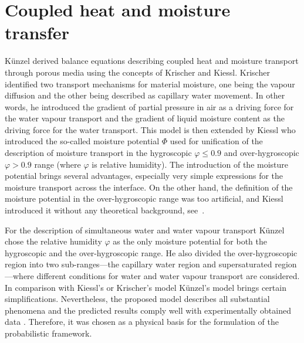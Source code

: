 \documentclass[preprint,12pt]{elsarticle}
\begin{document}
\section{Coupled heat and moisture transfer}
\label{sec:kunzel}
K\"{u}nzel \cite{Kunzel:1995, Kunzel:1997} derived balance equations
describing coupled heat and moisture transport through porous media
using the concepts of Krischer and Kiessl. Krischer
\cite{Krischer:1978} identified two transport mechanisms for material
moisture, one being the vapour diffusion and the other being described
as capillary water movement. In other words, he introduced the
gradient of partial pressure in air as a driving force for the water
vapour transport and the gradient of liquid moisture content as the
driving force for the water transport. This model is then extended by
Kiessl \cite{Kiessl:1983} who introduced the so-called moisture
potential $\Phi$ used for unification of the description of moisture
transport in the hygroscopic $\varphi\leq 0.9$ and over-hygroscopic
$\varphi > 0.9$ range (where $\varphi$ is relative humidity). The
introduction of the moisture potential brings several advantages,
especially very simple expressions for the moisture transport across
the interface. On the other hand, the definition of the moisture
potential in the over-hygroscopic range was too artificial, and Kiessl
introduced it without any theoretical background,
see~\cite{Cerny:2002}.

For the description of simultaneous water and water vapour
transport K\"{u}nzel chose the relative humidity $\varphi$ as the
only moisture potential for both the hygroscopic and the over-hygroscopic
range. He also divided the over-hygroscopic region into two
sub-ranges---the capillary water region and supersaturated
region---where different
conditions for water and water vapour transport are considered. In
comparison with Kiessl's or Krischer's model K\"{u}nzel's model
brings certain simplifications. Nevertheless, the proposed model
describes all substantial phenomena and the predicted results
comply well with experimentally obtained data
\cite{Sykora:2011:AMC}. Therefore, it was chosen as a physical basis
for the formulation of the probabilistic framework.
\end{document}
